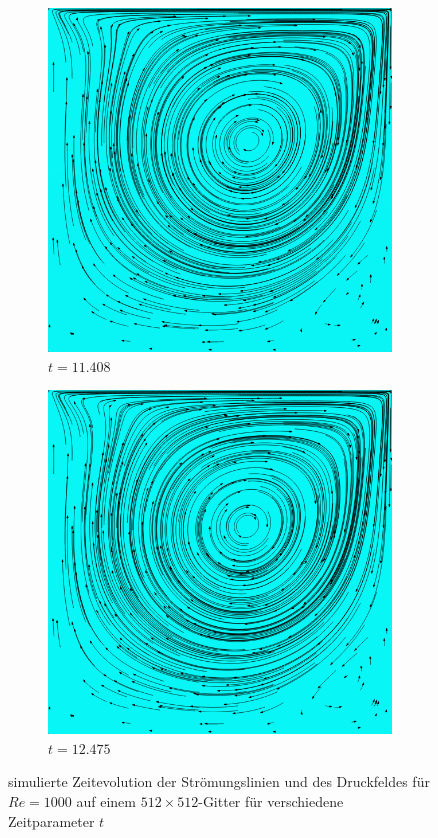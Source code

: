 \begin{figure}[!htb]
			\begin{subfigure}[b]{.5\textwidth}
				\includegraphics[scale = 0.28]{screenshots/re-1000-512-11408.png}
				\caption{$t=11.408$}
			\end{subfigure}%
			\begin{subfigure}[b]{.5\textwidth}
				\includegraphics[scale = 0.28]{screenshots/re-1000-512-12475.png}
				\caption{$t=12.475$}
			\end{subfigure}
			\caption{simulierte Zeitevolution der Strömungslinien und des Druckfeldes für $Re=1000$ auf einem $512\times 512$-Gitter für verschiedene Zeitparameter $t$}
			\label{fig:time re 1000 2}
		\end{figure}

